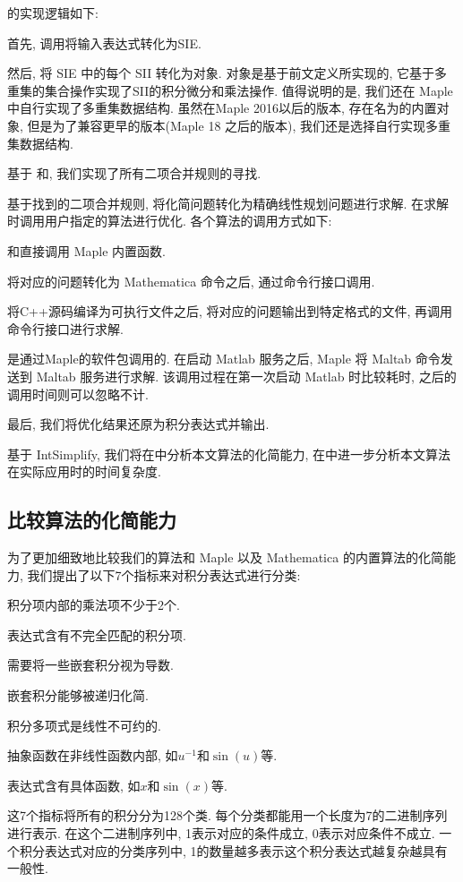 的实现逻辑如下:
\begin{compactenum}[Step 1.]
\item 首先, 调用将输入表达式转化为SIE.
\item 然后, 将 SIE 中的每个 SII 转化为对象. 对象是基于前文定义所实现的, 它基于多重集的集合操作实现了SII的积分\D 微分和乘法操作. 值得说明的是, 我们还在 Maple 中自行实现了多重集数据结构. 虽然在Maple 2016以后的版本, 存在名为的内置对象, 但是为了兼容更早的版本(Maple 18 之后的版本), 我们还是选择自行实现多重集数据结构.
\item 基于\D {}\D {} 和, 我们实现了所有二项合并规则的寻找.
\item 基于找到的二项合并规则, 将化简问题转化为精确线性规划问题进行求解. 在求解时调用用户指定的算法进行优化. 各个算法的调用方式如下:
\begin{compactitem}[\textbullet]
\item {}和直接调用 Maple 内置函数.
\item {}将对应的问题转化为 Mathematica 命令之后, 通过命令行接口调用.
\item {}将C++源码编译为可执行文件之后, 将对应的问题输出到特定格式的文件, 再调用命令行接口进行求解.
\item {}是通过Maple的软件包调用的. 在启动 Matlab 服务之后, Maple 将 Maltab 命令发送到 Maltab 服务进行求解. 该调用过程在第一次启动 Matlab 时比较耗时, 之后的调用时间则可以忽略不计.
\end{compactitem}
\item 最后, 我们将优化结果还原为积分表达式并输出.
\end{compactenum}

基于 IntSimplify, 我们将在中分析本文算法的化简能力, 在中进一步分析本文算法在实际应用时的时间复杂度. 

\subsection{比较算法的化简能力}\label{sec5.1-03}
为了更加细致地比较我们的算法和 Maple 以及 Mathematica 的内置算法的化简能力, 我们提出了以下7个指标来对积分表达式进行分类:
\begin{compactenum}[(1) ]
\item 积分项内部的乘法项不少于2个.
\item 表达式含有不完全匹配的积分项.
\item 需要将一些嵌套积分视为导数. 
\item 嵌套积分能够被递归化简.
\item 积分多项式是线性不可约的.
\item 抽象函数在非线性函数内部, 如$u^{-1}$和$\sin(u)$等.  
\item 表达式含有具体函数, 如$x$和$\sin(x)$等. 
\end{compactenum} 
这7个指标将所有的积分分为128个类. 每个分类都能用一个长度为7的二进制序列进行表示. 在这个二进制序列中, 1表示对应的条件成立, 0表示对应条件不成立. 一个积分表达式对应的分类序列中, 1的数量越多表示这个积分表达式越复杂\D 越具有一般性. 


